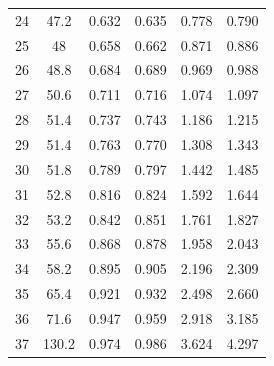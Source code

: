 \begin{table}[H]
\begin{tabular}{cccccc}
    24         & 47.2                        & 0.632                      & 0.635                       & 0.778                   & 0.790                   \\
    25         & 48                          & 0.658                      & 0.662                       & 0.871                   & 0.886                   \\
    26         & 48.8                        & 0.684                      & 0.689                       & 0.969                   & 0.988                   \\
    27         & 50.6                        & 0.711                      & 0.716                       & 1.074                   & 1.097                   \\
    28         & 51.4                        & 0.737                      & 0.743                       & 1.186                   & 1.215                   \\
    29         & 51.4                        & 0.763                      & 0.770                       & 1.308                   & 1.343                   \\
    30         & 51.8                        & 0.789                      & 0.797                       & 1.442                   & 1.485                   \\
    31         & 52.8                        & 0.816                      & 0.824                       & 1.592                   & 1.644                   \\
    32         & 53.2                        & 0.842                      & 0.851                       & 1.761                   & 1.827                   \\
    33         & 55.6                        & 0.868                      & 0.878                       & 1.958                   & 2.043                   \\
    34         & 58.2                        & 0.895                      & 0.905                       & 2.196                   & 2.309                   \\
    35         & 65.4                        & 0.921                      & 0.932                       & 2.498                   & 2.660                   \\
    36         & 71.6                        & 0.947                      & 0.959                       & 2.918                   & 3.185                   \\
    37         & 130.2                       & 0.974                      & 0.986                       & 3.624                   & 4.297   \\
    \bottomrule               
    \end{tabular}
    \end{table}

